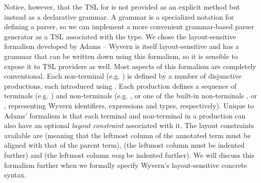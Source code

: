 Notice, however, that the TSL for  is not provided as an explicit  method but instead as a declarative grammar. A grammar is a specialized notation for defining a parser, so we can implement a more convenient grammar-based parser generator  as a TSL associated with the  type. We chose the  layout-sensitive formalism developed by Adams \cite{Adams:2013:PPI:2429069.2429129} -- Wyvern is itself layout-sensitive and has a grammar that can be written down using this formalism, so it is sensible to expose it to TSL providers as well. Most aspects of this formalism are completely conventional. 
Each non-terminal (e.g. ) is defined by a number of disjunctive productions, each introduced using \li{->}. Each production defines a sequence of terminals (e.g. ) and non-terminals (e.g. , or one of the built-in non-terminals ,  or , representing Wyvern identifiers, expressions and types, respectively). Unique to Adams' formalism is that each terminal and non-terminal in a production can also have an optional \emph{layout constraint} associated with it. The layout constraints available are \li{=} (meaning that the leftmost column of the annotated term must be aligned with that of the parent term), \li{>} (the leftmost column must be indented further) and \li{>=} (the leftmost column \emph{may} be indented further). We will discuss this formalism further when we formally specify Wyvern's layout-sensitive concrete syntax.

